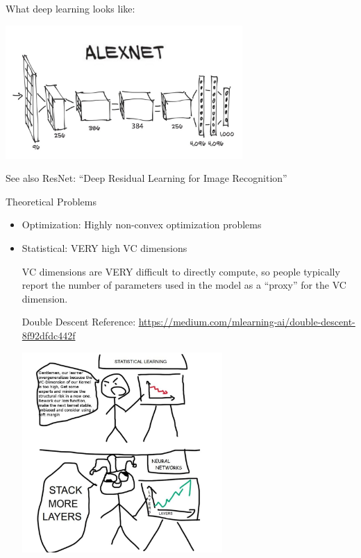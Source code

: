 \documentclass[10pt]{exam}
\theoremstyle{definition}
\begin{document}
\noindent
What deep learning looks like:

\includegraphics[height=2in]{alexnet}

\vspace{4in}
See also ResNet: ``Deep Residual Learning for Image Recognition''

\newpage
\noindent
Theoretical Problems
\begin{itemize}
    \item Optimization: Highly non-convex optimization problems
        \vspace{1in}

    \item Statistical: VERY high VC dimensions

    VC dimensions are VERY difficult to directly compute,
    so people typically report the number of parameters used in the model as a ``proxy'' for the VC dimension.

        \vspace{2in}


    Double Descent
        Reference: \url{https://medium.com/mlearning-ai/double-descent-8f92dfdc442f}

        \vspace{1.5in}
        \hspace{4in}\includegraphics[height=3in]{stack_layers}
        \vspace{-1in}
\end{itemize}
\end{document}
